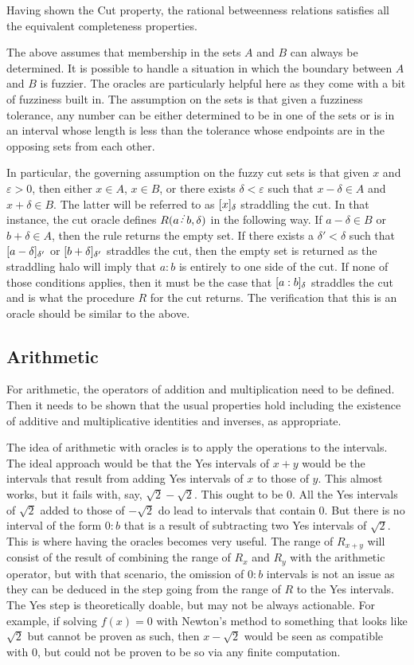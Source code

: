 \documentclass[12pt]{article}
\begin{document}
Having shown the Cut property, the rational betweenness relations satisfies all the equivalent completeness properties. 

The above assumes that membership in the sets $A$ and $B$ can always be determined. It is possible to handle a situation in which the boundary between $A$ and $B$ is fuzzier. The oracles are particularly helpful here as they come with a bit of fuzziness built in. The assumption on the sets is that given a fuzziness tolerance, any number can be either determined to be in one of the sets or is in an interval whose length is less than the tolerance whose endpoints are in the opposing sets from each other. 

In particular, the governing assumption on the fuzzy cut sets is that given $x$ and $\varepsilon >0$, then either $x \in A$, $x \in B$, or there exists $\delta< \varepsilon$ such that $x-\delta \in A$ and $x + \delta \in B$. The latter will be referred to as $\halo{x}$ straddling the cut. In that instance, the cut oracle defines $R(a \lte b, \delta)$ in the following way. If $a - \delta \in B$ or $b + \delta \in A$, then the rule returns the empty set. If there exists a $\delta' < \delta$ such that $\halo[\delta']{a-\delta}$ or $\halo[\delta']{b+\delta}$ straddles the cut, then the empty set is returned as the straddling halo will imply that $a:b$ is entirely to one side of the cut. If none of those conditions applies, then it must be the case that $\halo{a:b}$ straddles the cut and is what the procedure $R$ for the cut returns. The verification that this is an oracle should be similar to the above. 


\subsection{Arithmetic}

For arithmetic, the operators of addition and multiplication need to be defined. Then it needs to be shown that the usual properties hold including the existence of additive and multiplicative identities and inverses, as appropriate. 

The idea of arithmetic with oracles is to apply the operations to the intervals. The ideal approach would be that the Yes intervals of $x+y$ would be the intervals that result from adding Yes intervals of $x$ to those of $y$. This almost works, but it fails with, say, $\sqrt{2} - \sqrt{2}$. This ought to be 0. All the Yes intervals of $\sqrt{2}$ added to those of $-\sqrt{2}$ do lead to intervals that contain 0. But there is no interval of the form $0:b$ that is a result of subtracting two Yes intervals of $\sqrt{2}$. This is where having the oracles becomes very useful. The range of $R_{x+y}$ will consist of the result of combining the range of $R_x$ and $R_y$ with the arithmetic operator, but with that scenario, the omission of $0:b$ intervals is not an issue as they can be deduced in the step going from the range of $R$ to the Yes intervals. The Yes step is theoretically doable, but may not be always actionable. For example, if solving $f(x)=0$ with Newton's method to something that looks like $\sqrt{2}$ but cannot be proven as such, then $x - \sqrt{2}$ would be seen as compatible with 0, but could not be proven to be so via any finite computation. 
\end{document}
